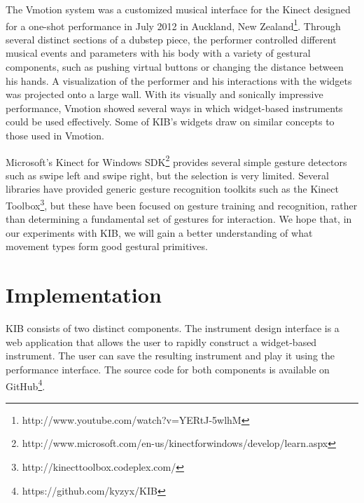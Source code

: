 \documentclass{nime-alternate}
\begin{document}
The Vmotion system was a customized musical interface for the Kinect designed for a one-shot performance in July 2012
in Auckland, New Zealand\footnote{http://www.youtube.com/watch?v=YERtJ-5wlhM}. Through 
several distinct sections of a dubstep piece, the performer controlled different musical
events and parameters with his body with a variety of gestural components, such as pushing virtual buttons
or changing the distance between his hands. A visualization of the performer and his interactions with the widgets was
projected onto a large wall. With its visually and sonically impressive performance, Vmotion showed several ways 
in which widget-based instruments could be used effectively. Some of KIB's widgets draw on similar concepts to those
used in Vmotion.

Microsoft's Kinect for Windows SDK\footnote{http://www.microsoft.com/en-us/kinectforwindows/develop/learn.aspx} provides several simple gesture detectors such as swipe left and
swipe right, but the selection is very limited. Several libraries have provided generic gesture recognition toolkits such as the Kinect Toolbox\footnote{http://kinecttoolbox.codeplex.com/}, but these have been focused on gesture training and recognition, rather
than determining a fundamental set of gestures for interaction. We hope that, in our
experiments with KIB, we will gain a better understanding of what movement types form good gestural primitives.
\section{Implementation}
KIB consists of two distinct components. The instrument design interface is a web
application that allows the user to rapidly construct a widget-based instrument. The user
can save the resulting instrument and play it using the performance interface. The source code
for both components is available on GitHub\footnote{https://github.com/kyzyx/KIB}.
\end{document}
